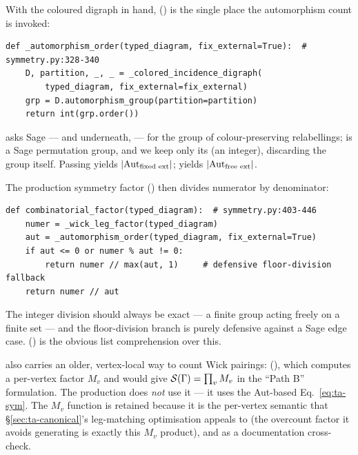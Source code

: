 With the coloured digraph in hand, 
() is the single place the automorphism count is
invoked:

\begin{lstlisting}
def _automorphism_order(typed_diagram, fix_external=True):  # symmetry.py:328-340
    D, partition, _, _ = _colored_incidence_digraph(
        typed_diagram, fix_external=fix_external)
    grp = D.automorphism_group(partition=partition)
    return int(grp.order())
\end{lstlisting}

 asks Sage --- and underneath,
 --- for the group of colour-preserving relabellings;  is a
Sage permutation group, and we keep only its  (an integer),
discarding the group itself. Passing  yields
$|\mathrm{Aut}_{\text{fixed ext}}|$;  yields $|\mathrm{Aut}_{\text{free ext}}|$.

The production symmetry factor 
() then divides numerator by denominator:

\begin{lstlisting}
def combinatorial_factor(typed_diagram):  # symmetry.py:403-446
    numer = _wick_leg_factor(typed_diagram)
    aut = _automorphism_order(typed_diagram, fix_external=True)
    if aut <= 0 or numer % aut != 0:
        return numer // max(aut, 1)     # defensive floor-division fallback
    return numer // aut
\end{lstlisting}

The integer division should always be exact --- a finite group acting freely on a
finite set --- and the floor-division branch is purely defensive against a Sage
edge case. 
() is the obvious list comprehension over this.

\begin{note}
 also carries an older, vertex-local way to count Wick
pairings:  (),
which computes a per-vertex factor $M_v$ and would give
$\mathcal{S}(\Gamma) = \prod_v M_v$ in the ``Path B'' formulation. The production
 does \emph{not} use it --- it uses the Aut-based
Eq.~\eqref{eq:ta-sym}. The $M_v$ function is retained because it is the
per-vertex semantic that \S\ref{sec:ta-canonical}'s leg-matching optimisation
appeals to (the overcount factor it avoids generating is exactly this $M_v$
product), and as a documentation cross-check.
\end{note}

